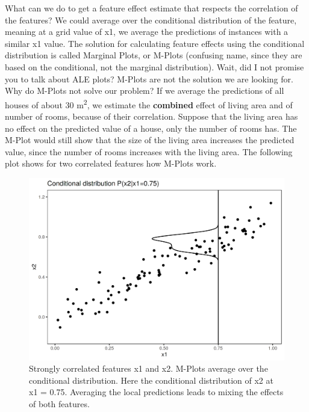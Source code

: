 \documentclass[12pt,]{krantz}
\begin{document}
What can we do to get a feature effect estimate that respects the
correlation of the features? We could average over the conditional
distribution of the feature, meaning at a grid value of x1, we average
the predictions of instances with a similar x1 value. The solution for
calculating feature effects using the conditional distribution is called
Marginal Plots, or M-Plots (confusing name, since they are based on the
conditional, not the marginal distribution). Wait, did I not promise you
to talk about ALE plots? M-Plots are not the solution we are looking
for. Why do M-Plots not solve our problem? If we average the predictions
of all houses of about 30 m\textsuperscript{2}, we estimate the
\textbf{combined} effect of living area and of number of rooms, because
of their correlation. Suppose that the living area has no effect on the
predicted value of a house, only the number of rooms has. The M-Plot
would still show that the size of the living area increases the
predicted value, since the number of rooms increases with the living
area. The following plot shows for two correlated features how M-Plots
work.

\begin{figure}

{\centering \includegraphics[width=\textwidth]{images/aleplot-motivation2-1} 

}

\caption{Strongly correlated features x1 and x2. M-Plots average over the conditional distribution. Here the conditional distribution of x2 at x1 = 0.75. Averaging the local predictions leads to mixing the effects of both features.}\label{fig:aleplot-motivation2}
\end{figure}
\end{document}
